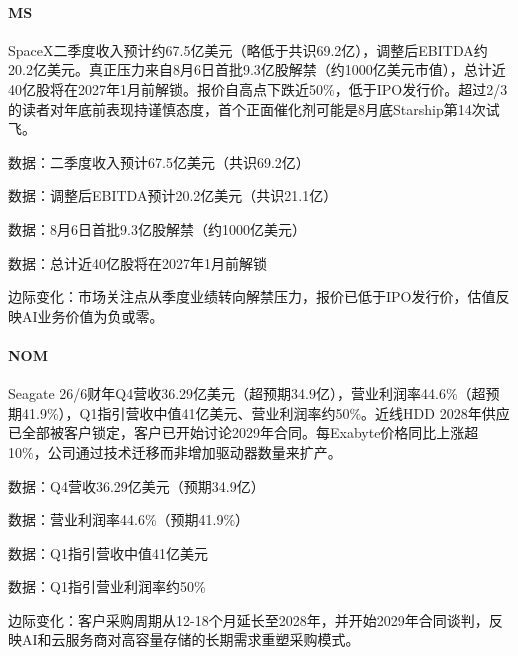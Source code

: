 \documentclass[11pt]{ctexart}
\begin{document}
\paragraph{MS} SpaceX二季度收入预计约67.5亿美元（略低于共识69.2亿），调整后EBITDA约20.2亿美元。真正压力来自8月6日首批9.3亿股解禁（约1000亿美元市值），总计近40亿股将在2027年1月前解锁。报价自高点下跌近50\%，低于IPO发行价。超过2/3的读者对年底前表现持谨慎态度，首个正面催化剂可能是8月底Starship第14次试飞。
{\small\color{refgray}数据：二季度收入预计67.5亿美元（共识69.2亿）\par}
{\small\color{refgray}数据：调整后EBITDA预计20.2亿美元（共识21.1亿）\par}
{\small\color{refgray}数据：8月6日首批9.3亿股解禁（约1000亿美元）\par}
{\small\color{refgray}数据：总计近40亿股将在2027年1月前解锁\par}
{\small\color{refgray}边际变化：市场关注点从季度业绩转向解禁压力，报价已低于IPO发行价，估值反映AI业务价值为负或零。\par}
\paragraph{NOM} Seagate 26/6财年Q4营收36.29亿美元（超预期34.9亿），营业利润率44.6\%（超预期41.9\%），Q1指引营收中值41亿美元、营业利润率约50\%。近线HDD 2028年供应已全部被客户锁定，客户已开始讨论2029年合同。每Exabyte价格同比上涨超10\%，公司通过技术迁移而非增加驱动器数量来扩产。
{\small\color{refgray}数据：Q4营收36.29亿美元（预期34.9亿）\par}
{\small\color{refgray}数据：营业利润率44.6\%（预期41.9\%）\par}
{\small\color{refgray}数据：Q1指引营收中值41亿美元\par}
{\small\color{refgray}数据：Q1指引营业利润率约50\%\par}
{\small\color{refgray}边际变化：客户采购周期从12-18个月延长至2028年，并开始2029年合同谈判，反映AI和云服务商对高容量存储的长期需求重塑采购模式。\par}
\end{document}
